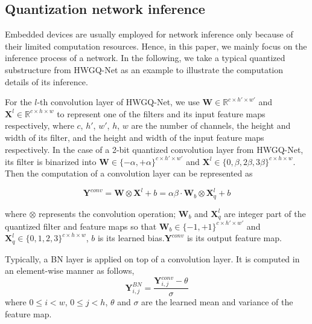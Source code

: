 \documentclass[10pt,twocolumn,letterpaper]{article}
\begin{document}
\subsection{Quantization network inference}\label{subSec:QCNNInfere}
Embedded devices are usually employed for network inference only because of their limited computation resources. Hence, in this paper, we mainly focus on the inference process of a network. In the following, we take a typical quantized substructure from HWGQ-Net as an example to illustrate the computation details of its inference.



For the $l$-th convolution layer of HWGQ-Net, we use $\textbf{W}\in\mathbb{R}^{c\times h{'} \times w {'}}$ and $\textbf{X}^l\in\mathbb{R}^{c\times h \times w}$ to represent one of the filters and its input feature maps respectively, where $c$, $h{'}$, $w{'}$, $h$, $w$ are the number of channels, the height and width of its filter, and the height and width of the input feature maps respectively. In the case of a 2-bit quantized convolution layer from HWGQ-Net, its filter is binarized into $\textbf{W}\in\{-\alpha, +\alpha\}^{c\times h{'}\times w{'}}$ and $\textbf{X}^l\in\{0, \beta, 2\beta, 3\beta\}^{c\times h \times w}$. Then the computation of a convolution layer can be represented as

\begin{equation} \label{equa0}
\textbf{Y}^{conv}=\textbf{W}\otimes \textbf{X}^l+b=\alpha\beta \cdot\textbf{W}_b\otimes \textbf{X}^l_q+b
\end{equation}

where $\otimes$ represents the convolution operation; $\textbf{W}_b$ and $\textbf{X}^l_q$ are integer part of the quantized filter and feature maps so that $\textbf{W}_b \in \{-1,+1\}^{c\times h{'}\times w{'}}$ and $\textbf{X}^l_q \in\{0, 1, 2, 3\}^{c\times h \times w}$, $b$ is its learned bias.$ \textbf{Y}^{conv}$ is its output feature map. 



Typically, a BN layer is applied on top of a convolution layer. It is computed in an element-wise manner as follows,
\begin{equation} \label{equ:BN0}
\textbf{Y}^{BN}_{i,j}=\frac{\textbf{Y}^{conv}_{i,j}-\theta}{\sigma}
\end{equation}
where $0\leq i<w$, $0\leq j<h$, $\theta$ and $\sigma$ are the learned mean and variance of the feature map.
\end{document}
